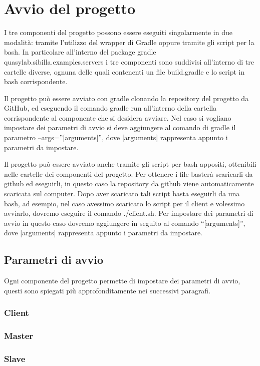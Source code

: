 
\newpage

\section{Avvio del progetto}
I tre componenti del progetto possono essere eseguiti singolarmente in due modalità: tramite l’utilizzo del wrapper di Gradle oppure tramite gli script per la bash. In particolare all’interno del package gradle quasylab.sibilla.examples.servers i tre componenti sono suddivisi all’interno di tre cartelle diverse, ognuna delle quali contenenti un file build.gradle e lo script in bash corrispondente.

Il progetto può essere avviato con gradle clonando la repository del progetto da GitHub, ed eseguendo il comando gradle run all’interno della cartella corrispondente al componente che si desidera avviare. Nel caso si vogliano impostare dei parametri di avvio si deve aggiungere al comando di gradle il parametro --args=”[arguments]”, dove [arguments] rappresenta appunto i parametri da impostare.

Il progetto può essere avviato anche tramite gli script per bash appositi, ottenibili nelle cartelle dei componenti del progetto. Per ottenere i file basterà scaricarli da github ed eseguirli, in questo caso la repository da github viene automaticamente scaricata sul computer. Dopo aver scaricato tali script basta eseguirli da una bash, ad esempio, nel caso avessimo scaricato lo script per il client e volessimo avviarlo, dovremo eseguire il comando ./client.sh. Per impostare dei parametri di avvio in questo caso dovremo aggiungere in seguito al comando “[arguments]”, dove [arguments] rappresenta appunto i parametri da impostare.

\subsection{Parametri di avvio}

Ogni componente del progetto permette di impostare dei parametri di avvio, questi sono spiegati più approfonditamente nei successivi paragrafi.

\subsubsection{Client}

\subsubsection{Master}

\subsubsection{Slave}